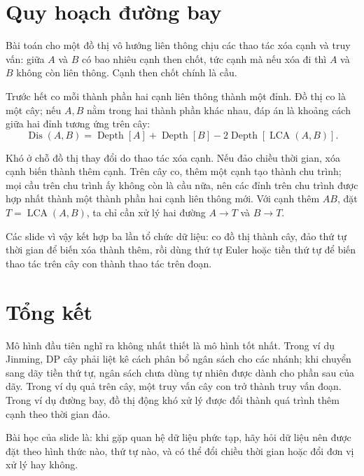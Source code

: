 \documentclass[11pt]{article}
\newcommand{\LCA}{\operatorname{LCA}}
\newcommand{\Depth}{\operatorname{Depth}}
\newcommand{\Dis}{\operatorname{Dis}}
\begin{document}
\section{Quy hoạch đường bay}

Bài toán cho một đồ thị vô hướng liên thông chịu các thao tác xóa cạnh và
truy vấn: giữa \(A\) và \(B\) có bao nhiêu cạnh then chốt, tức cạnh mà nếu
xóa đi thì \(A\) và \(B\) không còn liên thông. Cạnh then chốt chính là cầu.

Trước hết co mỗi thành phần hai cạnh liên thông thành một đỉnh. Đồ thị co là
một cây; nếu \(A,B\) nằm trong hai thành phần khác nhau, đáp án là khoảng
cách giữa hai đỉnh tương ứng trên cây:
\[
  \Dis(A,B)=\Depth[A]+\Depth[B]-2\Depth[\LCA(A,B)].
\]

Khó ở chỗ đồ thị thay đổi do thao tác xóa cạnh. Nếu đảo chiều thời gian, xóa
cạnh biến thành thêm cạnh. Trên cây co, thêm một cạnh tạo thành chu trình;
mọi cầu trên chu trình ấy không còn là cầu nữa, nên các đỉnh trên chu trình
được hợp nhất thành một thành phần hai cạnh liên thông mới. Với cạnh thêm
\(AB\), đặt \(T=\LCA(A,B)\), ta chỉ cần xử lý hai đường \(A\to T\) và
\(B\to T\).

Các slide vì vậy kết hợp ba lần tổ chức dữ liệu: co đồ thị thành cây, đảo
thứ tự thời gian để biến xóa thành thêm, rồi dùng thứ tự Euler hoặc tiền thứ
tự để biến thao tác trên cây con thành thao tác trên đoạn.

\section{Tổng kết}

Mô hình đầu tiên nghĩ ra không nhất thiết là mô hình tốt nhất. Trong ví dụ
Jinming, DP cây phải liệt kê cách phân bổ ngân sách cho các nhánh; khi chuyển
sang dãy tiền thứ tự, ngân sách chưa dùng tự nhiên được dành cho phần sau của
dãy. Trong ví dụ quả trên cây, một truy vấn cây con trở thành truy vấn đoạn.
Trong ví dụ đường bay, đồ thị động khó xử lý được đổi thành quá trình thêm
cạnh theo thời gian đảo.

Bài học của slide là: khi gặp quan hệ dữ liệu phức tạp, hãy hỏi dữ liệu nên
được đặt theo hình thức nào, thứ tự nào, và có thể đổi chiều thời gian hoặc
đổi đơn vị xử lý hay không.
\end{document}

